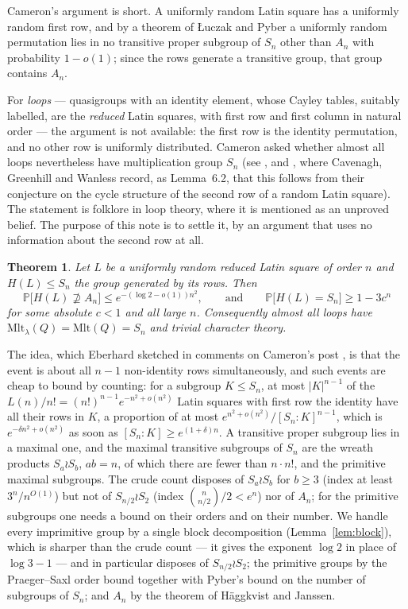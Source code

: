 \documentclass[11pt]{amsart}
\theoremstyle{plain}
\newtheorem{theorem}{Theorem}
\theoremstyle{remark}
\newcommand{\Mlt}{\mathrm{Mlt}}
\renewcommand{\Pr}{\mathbb{P}}
\begin{document}
Cameron's argument is short.  A uniformly random Latin square has a
uniformly random first row, and by a theorem of {\L}uczak and Pyber
\cite{LP93} a uniformly random permutation lies in no transitive proper
subgroup of $S_n$ other than $A_n$ with probability $1-o(1)$; since the
rows generate a transitive group, that group contains $A_n$.

For \emph{loops} --- quasigroups with an identity element, whose Cayley
tables, suitably labelled, are the \emph{reduced} Latin squares, with
first row and first column in natural order --- the argument is not
available: the first row is the identity permutation, and no other row
is uniformly distributed.  Cameron asked whether almost all loops nevertheless have
multiplication group $S_n$ (see \cite{Cam15}, and \cite[\S6]{CGW08},
where Cavenagh, Greenhill and Wanless record, as Lemma~6.2, that this
follows from their conjecture on the cycle structure of the second row
of a random Latin square).  The statement is folklore in loop theory,
where it is mentioned as an unproved belief.  The purpose of this note
is to settle it, by an argument that uses no information about the
second row at all.

\begin{theorem}\label{thm:main}
Let $L$ be a uniformly random reduced Latin square of order $n$ and
$H(L)\le S_n$ the group generated by its rows.  Then
\[
\Pr\bigl[H(L)\not\supseteq A_n\bigr]\le e^{-(\log2-o(1))n^2},
\qquad\text{and}\qquad
\Pr\bigl[H(L)=S_n\bigr]\ge1-3c^n
\]
for some absolute $c<1$ and all large $n$.  Consequently almost all loops
have $\Mlt_\lambda(Q)=\Mlt(Q)=S_n$ and trivial character theory.
\end{theorem}

The idea, which Eberhard sketched in comments on Cameron's post
\cite{Cam15}, is that the event is about all $n-1$ non-identity rows
simultaneously, and such events are cheap to bound by counting: for a
subgroup $K\le S_n$, at most $|K|^{n-1}$ of the $L(n)/n!=(n!)^{n-1}e^{-n^2+o(n^2)}$
Latin squares with first row the identity have all their rows in $K$,
a proportion of at most $e^{n^2+o(n^2)}/[S_n:K]^{n-1}$, which is
$e^{-\delta n^2+o(n^2)}$ as soon as $[S_n:K]\ge e^{(1+\delta)n}$.  A
transitive proper subgroup lies in a maximal one, and the maximal
transitive subgroups of $S_n$ are the wreath products $S_a\wr S_b$,
$ab=n$, of which there are fewer than $n\cdot n!$, and the primitive
maximal subgroups.  The crude count disposes of $S_a\wr S_b$ for
$b\ge3$ (index at least $3^n/n^{O(1)}$) but not of $S_{n/2}\wr S_2$
(index $\binom n{n/2}/2<e^n$) nor of $A_n$; for the primitive
subgroups one needs a bound on their orders and on their number.  We
handle every imprimitive group by a single block decomposition
(Lemma~\ref{lem:block}), which is sharper than the crude count ---
it gives the exponent $\log2$ in place of $\log3-1$ --- and in
particular disposes of $S_{n/2}\wr S_2$; the primitive groups by the
Praeger--Saxl order bound together with Pyber's bound on the number of
subgroups of $S_n$; and $A_n$ by the theorem of H\"aggkvist and
Janssen.
\end{document}
